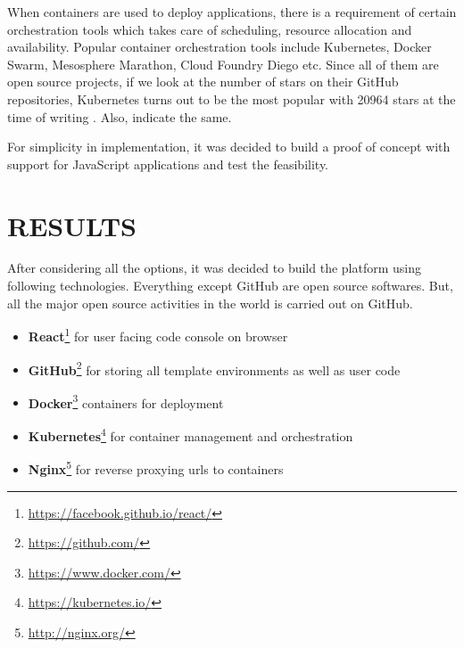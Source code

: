 \documentclass[DD]{iitmdiss}
\begin{document}
When containers are used to deploy applications, there is a requirement of certain orchestration tools which takes care of scheduling, resource allocation and availability. Popular container orchestration tools include Kubernetes, Docker Swarm, Mesosphere Marathon, Cloud Foundry Diego etc. Since all of them are open source projects, if we look at the number of stars on their GitHub repositories, Kubernetes turns out to be the most popular with 20964 stars at the time of writing \citep{github_stars_comparison}. Also, \cite{google_trends_kubernetes_docker_swarm} indicate the same.

For simplicity in implementation, it was decided to build a proof of concept with support for JavaScript applications and test the feasibility. 
\chapter{RESULTS}


After considering all the options, it was decided to build the platform using following technologies. Everything except GitHub are open source softwares. But, all the major open source activities in the world is carried out on GitHub.
\begin{itemize}
	\item \textbf{React}\footnote{\url{https://facebook.github.io/react/}} for user facing code console on browser
	\item \textbf{GitHub}\footnote{\label{github_website}\url{https://github.com/}} for storing all template environments as well as user code
	\item \textbf{Docker}\footnote{\url{https://www.docker.com/}} containers for deployment
	\item \textbf{Kubernetes}\footnote{\url{https://kubernetes.io/}} for container management and orchestration
	\item \textbf{Nginx}\footnote{\url{http://nginx.org/}} for reverse proxying urls to containers
\end{itemize}
\end{document}

